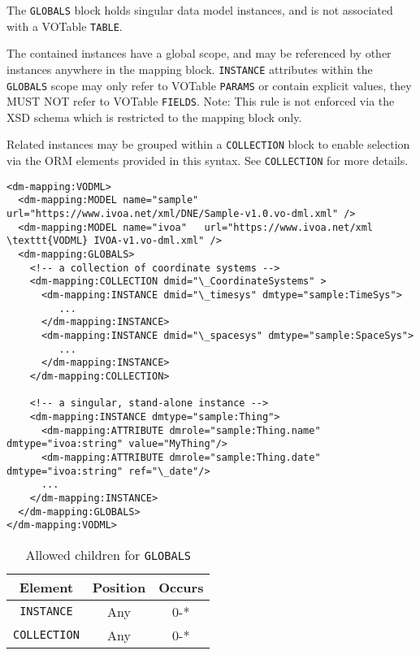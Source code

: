 The \texttt{GLOBALS} block holds singular data model instances, and is not associated 
with a VOTable \texttt{TABLE}.

The contained instances have a global scope, and may be
referenced by other instances anywhere in the mapping block.  \texttt{INSTANCE} attributes
within the \texttt{GLOBALS} scope may only refer to VOTable \texttt{PARAMS} or contain
explicit values, they MUST NOT refer to VOTable \texttt{FIELDS}.  Note: This rule is not enforced
via the XSD schema which is restricted to the mapping block only.

Related instances may be grouped within a \texttt{COLLECTION} block to enable selection
via the ORM elements provided in this syntax.  See \texttt{COLLECTION} for more details.

\begin{lstlisting}[frame=single,caption={Example \texttt{GLOBALS} block},style=XML,basicstyle=\tiny]
<dm-mapping:VODML>
  <dm-mapping:MODEL name="sample" url="https://www.ivoa.net/xml/DNE/Sample-v1.0.vo-dml.xml" />
  <dm-mapping:MODEL name="ivoa"   url="https://www.ivoa.net/xml \texttt{VODML} IVOA-v1.vo-dml.xml" />
  <dm-mapping:GLOBALS>
    <!-- a collection of coordinate systems -->
    <dm-mapping:COLLECTION dmid="\_CoordinateSystems" >
      <dm-mapping:INSTANCE dmid="\_timesys" dmtype="sample:TimeSys">
         ...
      </dm-mapping:INSTANCE>
      <dm-mapping:INSTANCE dmid="\_spacesys" dmtype="sample:SpaceSys">
         ...
      </dm-mapping:INSTANCE>
    </dm-mapping:COLLECTION>

    <!-- a singular, stand-alone instance -->
    <dm-mapping:INSTANCE dmtype="sample:Thing">
      <dm-mapping:ATTRIBUTE dmrole="sample:Thing.name" dmtype="ivoa:string" value="MyThing"/>
      <dm-mapping:ATTRIBUTE dmrole="sample:Thing.date" dmtype="ivoa:string" ref="\_date"/>
      ...
    </dm-mapping:INSTANCE>
  </dm-mapping:GLOBALS>
</dm-mapping:VODML>
\end{lstlisting}


\begin{table}[!htbp]
  \small
  \centering
  \begin{tabulary}{\linewidth}{|c |c |c|}
    \hline 
        \textbf{Element} &
        \textbf{Position} &
        \textbf{Occurs}\\
    \hline
    \hline
        \texttt{INSTANCE} &
        Any &
        0-*\\
    \hline
        \texttt{COLLECTION} &
        Any &
        0-*\\
    \hline
  \end{tabulary}
  \caption{Allowed children for \texttt{GLOBALS}} 
  \label{tbl:globals-children}
 \end{table}
